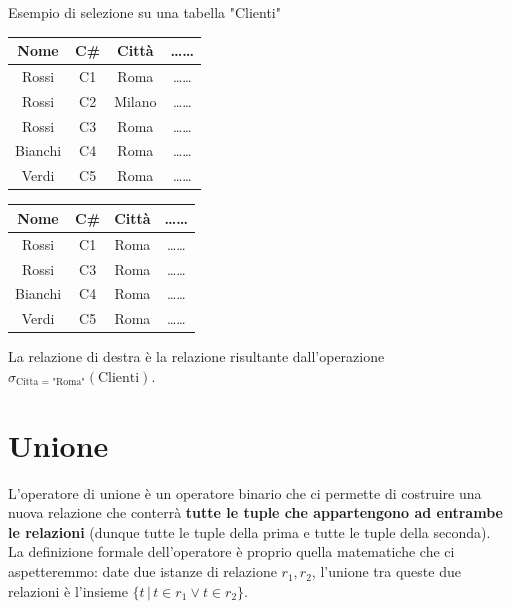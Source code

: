 \documentclass[12pt]{report}
\begin{document}
	\begin{esempio}{Esempio di selezione su una tabella "Clienti"}{}
		\noindent
		\begin{minipage}[c]{0.44\textwidth}
			\centering
			\renewcommand{\arraystretch}{1.3}
			\begin{tabular}{|c|c|c|c|}
				\hline
				\rowcolor{BrickRed!60!white}
				Nome & C\# & Citt\`a & \dots\dots \\
				\hline
				Rossi   & C1 & Roma   & \dots\dots \\
				Rossi   & C2 & Milano & \dots\dots \\
				Rossi   & C3 & Roma   & \dots\dots \\
				Bianchi & C4 & Roma   & \dots\dots \\
				Verdi   & C5 & Roma   & \dots\dots \\
				\hline
			\end{tabular}
		\end{minipage}\hfill
		\begin{minipage}[c]{0.08\textwidth}
			\centering
		\end{minipage}\hfill
		\begin{minipage}[c]{0.44\textwidth}
			\centering
			\renewcommand{\arraystretch}{1.3}
			\begin{tabular}{|c|c|c|c|}
				\hline
				\rowcolor{BrickRed!60!white}
				Nome & C\# & Citt\`a & \dots\dots \\
				\hline
				Rossi   & C1 & Roma & \dots\dots \\
				Rossi   & C3 & Roma & \dots\dots \\
				Bianchi & C4 & Roma & \dots\dots \\
				Verdi   & C5 & Roma & \dots\dots \\
				\hline
			\end{tabular}
		\end{minipage}
		
		\vspace{1em}
		La relazione di destra è la relazione risultante dall'operazione $\sigma_{\text{Citta = "Roma"}}(\text{Clienti})$.
	\end{esempio}
	
	\section{Unione}
	L'operatore di unione è un operatore binario che ci permette di costruire una nuova relazione che conterrà \textbf{tutte le tuple che appartengono ad entrambe le relazioni} (dunque tutte le tuple della prima e tutte le tuple della seconda).\\
	La definizione formale dell'operatore è proprio quella matematiche che ci aspetteremmo: date due istanze di relazione $r_1, r_2$, l'unione tra queste due relazioni è l'insieme $\{t \,|\, t \in r_1 \vee t \in r_2\}$.
	\smallbreak
	
\end{document}
